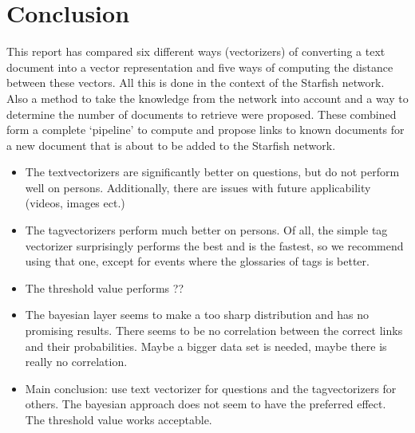 \section{Conclusion}
This report has compared six different ways (vectorizers) of converting a text
document into a vector representation and five ways of computing the distance
between these vectors. All this is done in the context of the Starfish network.
Also a method to take the knowledge from the network into account and a way to
determine the number of documents to retrieve were proposed. These combined
form a complete `pipeline' to compute and propose links to known documents for
a new document that is about to be added to the Starfish network.

\begin{itemize}
\item The textvectorizers are significantly better on questions, but do not
  perform well on persons. Additionally, there are issues with future
  applicability (videos, images ect.)
\item The tagvectorizers perform much better on persons. Of all, the simple tag
  vectorizer surprisingly performs the best and is the fastest, so we recommend
  using that one, except for events where the glossaries of tags is better. 
\item The threshold value performs ??
\item The bayesian layer seems to make a too sharp distribution and has no
  promising results. There seems to be no correlation between the correct links
  and their probabilities. Maybe a bigger data set is needed, maybe there is
  really no correlation. 
\item Main conclusion: use text vectorizer for questions and the tagvectorizers
  for others. The bayesian approach does not seem to have the preferred effect.
  The threshold value works acceptable. 
\end{itemize}

